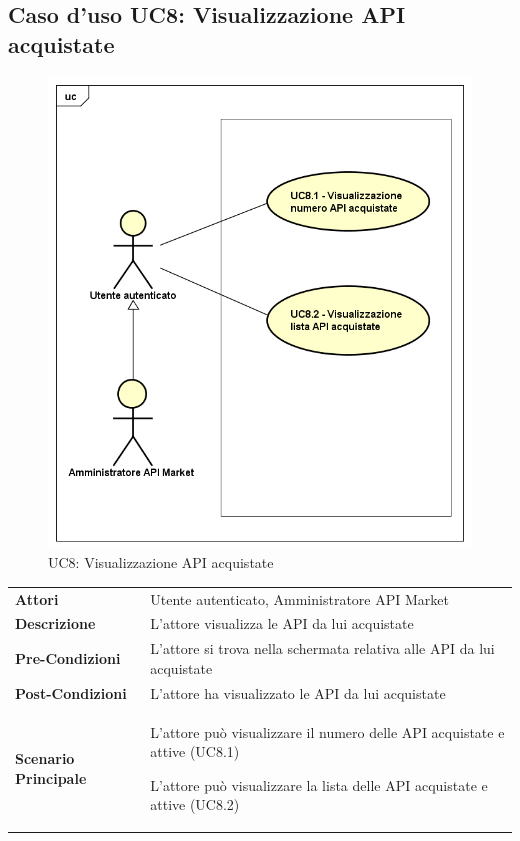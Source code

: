 \newpage
\subsection{Caso d'uso UC8: Visualizzazione API acquistate}
\label{UC8}
\begin{figure}[ht]
	\centering
	\includegraphics[scale=0.45]{UML/UC8.png}
	\caption{UC8: Visualizzazione API acquistate}
\end{figure}

\begin{longtable}{ l | p{11cm}}
	\hline
	\rowcolor{Gray}
	\multicolumn{2}{c}{UC8 - Visualizzazione API acquistate}\\
	\hline
	 \textbf{Attori} & Utente autenticato, Amministratore API Market \\
	\textbf{Descrizione} & L'attore visualizza le API da lui acquistate \\
	\textbf{Pre-Condizioni} & L'attore si trova nella schermata relativa alle API da lui acquistate \\
	\textbf{Post-Condizioni} & L'attore ha visualizzato le API da lui acquistate \\
	\textbf{Scenario Principale} & 
	\begin{enumerate*}[label=(\arabic*.),itemjoin={\newline}]
		\item L'attore può visualizzare il numero delle API acquistate e attive (UC8.1)
		\item L'attore può visualizzare la lista delle API acquistate e attive (UC8.2)
	\end{enumerate*}\\
\end{longtable}

